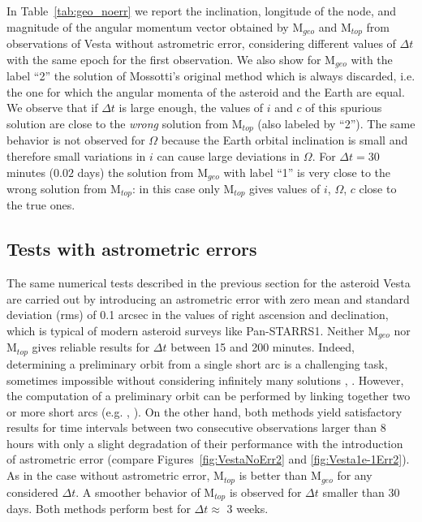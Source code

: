 \documentclass[11pt]{article}
\begin{document}
In Table~\ref{tab:geo_noerr} we report the inclination, longitude of the node, and magnitude of the angular momentum vector obtained by M$_{geo}$ and M$_{top}$ from observations of Vesta without astrometric error, considering different values of $\Delta t$ with the same epoch for the first observation. 
We also show for M$_{geo}$ with the label ``2'' the solution of Mossotti's original method which is always discarded, i.e. the one for which the angular momenta of the asteroid and the Earth are equal.
We observe that if $\Delta t$ is large enough, the values of $i$ and $c$ of this spurious solution are close to the \emph{wrong} solution from M$_{top}$ (also labeled by ``2''). The same behavior is not observed for $\Omega$ because the Earth orbital inclination is small and therefore small variations in $i$ can cause large deviations in $\Omega$.
For $\Delta t = 30$ minutes ($0.02$ days) the solution from M$_{geo}$ with label ``1'' is very close to the wrong solution from M$_{top}$: in this case only M$_{top}$ gives values of $i$, $\Omega$, $c$ close to the true ones.


\subsection{Tests with astrometric errors}
\label{s:error}

The same numerical tests described in the previous section for the asteroid Vesta are carried out by introducing an astrometric error with zero mean and standard deviation (rms) of 0.1 arcsec in the values of right ascension and declination, which is typical of modern asteroid surveys like Pan-STARRS1.
Neither M$_{geo}$ nor M$_{top}$ gives reliable results for $\Delta t$ between 15 and 200 minutes.
Indeed, determining a preliminary orbit from a single short arc is a challenging task, sometimes impossible without considering infinitely many solutions \cite{multsol}, \cite{admisreg}. 
However, the computation of a preliminary orbit can be performed by linking together two or more short arcs (e.g. \cite{gbm15}, \cite{gbm17}). 
On the other hand, both methods yield satisfactory results for time intervals between two consecutive observations larger than 8 hours with only a slight degradation of their performance with the introduction of astrometric error (compare Figures~\ref{fig:VestaNoErr2} and \ref{fig:Vesta1e-1Err2}). 
As in the case without astrometric error, M$_{top}$ is better than M$_{geo}$ for any considered $\Delta t$. 
A smoother behavior of M$_{top}$ is observed for $\Delta t$ smaller than 30 days. 
Both methods perform best for $\Delta t \approx$ 3 weeks.
\end{document}
